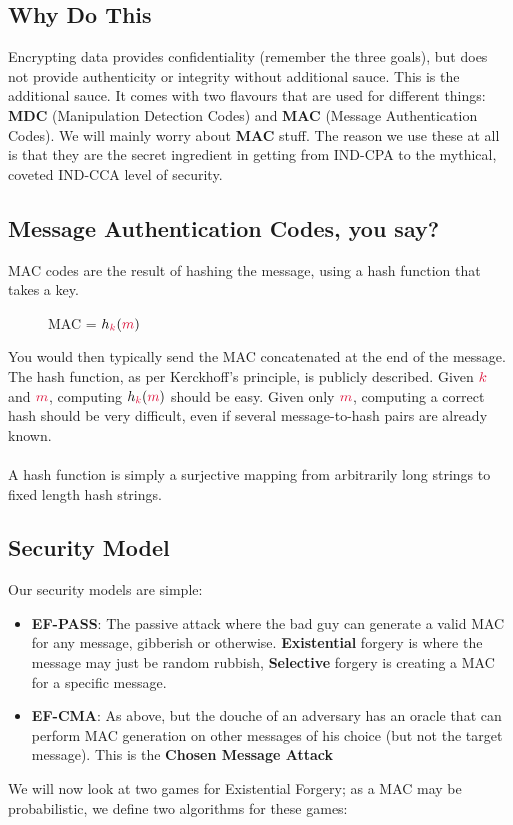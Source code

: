     \subsection{Why Do This}
        Encrypting data provides confidentiality (remember the three goals), but does not provide authenticity or integrity without additional sauce. This is the additional sauce.
        It comes with two flavours that are used for different things: \textbf{MDC} (Manipulation Detection Codes) and \textbf{MAC} (Message Authentication Codes). We will mainly worry about \textbf{MAC} stuff.
        The reason we use these at all is that they are the secret ingredient in getting from IND-CPA to the mythical, coveted IND-CCA level of security.


    \subsection{\textbf{M}essage \textbf{A}uthentication \textbf{C}odes, you say?}
    MAC codes are the result of hashing the message, using a hash function that takes a key.
    \begin{figure}[htp!]
        \centering
        MAC = $h_{\ck}(\cm)$
    \end{figure}
    You would then typically send the MAC concatenated at the end of the message. The hash function, as per Kerckhoff's principle, is publicly described. Given $\ck$ and $\cm$, computing $h_{\ck}(\cm)$ should be easy.
    Given only $\cm$, computing a correct hash should be very difficult, even if several message-to-hash pairs are already known.\\
    \\
    A hash function is simply a surjective mapping from arbitrarily long strings to fixed length hash strings.

    \subsection{Security Model}
    Our security models are simple:
    \begin{itemize}
        \item \textbf{EF-PASS}: The passive attack where the bad guy can generate a valid MAC for any message, gibberish or otherwise. 
        \textbf{Existential} forgery is where the message may just be random rubbish, \textbf{Selective} forgery is creating a MAC for a specific message.

        \item \textbf{EF-CMA}: As above, but the douche of an adversary has an oracle that can perform MAC generation on other messages of his choice (but not the target message). This is the \textbf{Chosen Message Attack}
    \end{itemize}
    We will now look at two games for Existential Forgery; as a MAC may be probabilistic, we define two algorithms for these games:


